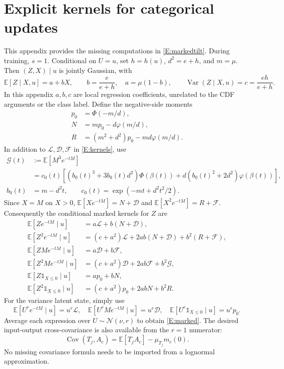 \documentclass[letterpaper]{article}
\newcommand{\E}{\mathbb E}
\newcommand{\Var}{\operatorname{Var}}
\newcommand{\Cov}{\operatorname{Cov}}
\newcommand{\Normal}{\mathcal N}
\newcommand{\ind}{\mathbb 1}
\newcommand{\given}{\mid}
\begin{document}
\section{Explicit kernels for categorical updates}\label{A:marked}
This appendix provides the missing computations in \eqref{E:markedtilt}. During training, $s=1$. Conditional on $U=u$, set $h=h(u)$, $d^2=e+h$, and $m=\mu$. Then $(Z,X)\given u$ is jointly Gaussian, with
\begin{equation}
\E[Z\given X,u]=a+bX,\qquad
b=\frac{e}{e+h},\quad a=\mu(1-b),\qquad
\Var(Z\given X,u)=c=\frac{eh}{e+h}.
\label{E:ZXregress}
\end{equation}
In this appendix $a,b,c$ are local regression coefficients, unrelated to the CDF arguments or the class label. Define the negative-side moments
\begin{align}
p_0&=\Phi(-m/d),\\
N&=mp_0-d\varphi(m/d),\\
R&=(m^2+d^2)p_0-md\varphi(m/d).
\end{align}
In addition to $\mathcal L,\mathcal D,\mathcal F$ in \eqref{E:kernels}, use
\begin{align}
\mathcal G(t)&:=\E[M^3e^{-tM}]\nonumber\\
&=c_0(t)\left[(b_0(t)^3+3b_0(t)d^2)\Phi(\beta(t))
+d(b_0(t)^2+2d^2)\varphi(\beta(t))\right],\\
b_0(t)&=m-d^2t,\qquad c_0(t)=\exp(-mt+d^2t^2/2).
\end{align}
Since $X=M$ on $X>0$, $\E[Xe^{-tM}]=N+\mathcal D$ and $\E[X^2e^{-tM}]=R+\mathcal F$. Consequently the conditional marked kernels for $Z$ are
\begin{align}
\E[Ze^{-tM}\given u]&=a\mathcal L+b(N+\mathcal D),\\
\E[Z^2e^{-tM}\given u]&=(c+a^2)\mathcal L+2ab(N+\mathcal D)+b^2(R+\mathcal F),\\
\E[ZMe^{-tM}\given u]&=a\mathcal D+b\mathcal F,\\
\E[Z^2Me^{-tM}\given u]&=(c+a^2)\mathcal D+2ab\mathcal F+b^2\mathcal G,\\
\E[Z\ind_{X\le0}\given u]&=ap_0+bN,\\
\E[Z^2\ind_{X\le0}\given u]&=(c+a^2)p_0+2abN+b^2R.
\label{E:zmarks}
\end{align}
For the variance latent state, simply use
\begin{equation}
\E[U^re^{-tM}\given u]=u^r\mathcal L,\quad
\E[U^rMe^{-tM}\given u]=u^r\mathcal D,\quad
\E[U^r\ind_{X\le0}\given u]=u^rp_0.
\end{equation}
Average each expression over $U\sim\Normal(\nu,r)$ to obtain \eqref{E:marked}. The desired input-output cross-covariance is also available from the $r=1$ numerator:
\begin{equation}
\Cov(T_j,A_c)=\E[T_jA_c]-\mu_{T_j}m_c(0).
\end{equation}
No missing covariance formula needs to be imported from a lognormal approximation.
\end{document}
